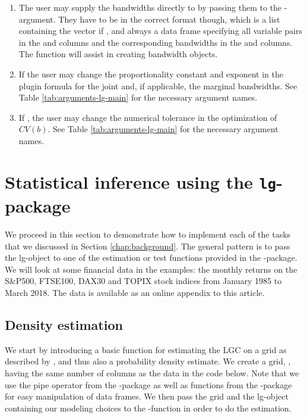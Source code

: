 \begin{enumerate}
\def\labelenumi{\arabic{enumi}.}
\item
  The user may supply the bandwidths directly to  by passing them to the -argument. They have to be in the   correct format though, which is a list containing the vector  if , and always a data frame  specifying all variable pairs in the  and  columns and the corresponding bandwidths
  in the  and  columns. The function  will assist in creating bandwidth objects.
\item
  If  the user may change the proportionality constant and exponent in the plugin formula for the joint and, if applicable, the marginal bandwidths. See Table \ref{tab:arguments-lg-main} for the necessary argument names.
\item
  If , the user may change the numerical tolerance in the optimization of \(CV(b)\). See Table \ref{tab:arguments-lg-main} for the necessary argument names.
\end{enumerate}

\section{Statistical inference using the \texttt{lg}-package}
\label{chap:inference}

We proceed in this section to demonstrate how to implement each of the tasks that we discussed in Section \ref{chap:background}. The general pattern is to pass the lg-object to one of the estimation or test functions provided in the -package. We will look at some financial data in the examples: the monthly returns on the S\&P500, FTSE100, DAX30 and TOPIX stock indices from January 1985 to March 2018. The data is available as an online appendix to this article.

\subsection{Density estimation}\label{chap:density}

We start by introducing a basic function for estimating the LGC on a grid as described by \citet{otne:tjos:2017}, and thus also a probability density estimate. We create a grid, , having the same number of columns as the data in the code below. Note that we use the pipe operator \code{\%\textgreater{}\%} from the -package \citep{bach:wick:2014} as well as functions from the -package \citep{wick:fran:mull:2018} for easy manipulation of data frames. We then pass the grid and the lg-object containing our modeling choices to the -function in order to do the estimation.

